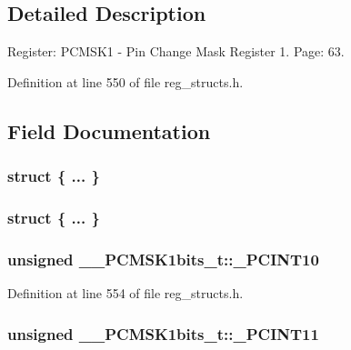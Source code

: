 \subsection{Detailed Description}
Register\+: P\+C\+M\+S\+K1 -\/ Pin Change Mask Register 1. Page\+: 63. 

Definition at line 550 of file reg\+\_\+structs.\+h.



\subsection{Field Documentation}
\hypertarget{union_____p_c_m_s_k1bits__t_a107fd294fbf0feff9d32f2159b25b7c4}{\subsubsection[{"@133}]{\setlength{\rightskip}{0pt plus 5cm}struct \{ ... \} }}\label{union_____p_c_m_s_k1bits__t_a107fd294fbf0feff9d32f2159b25b7c4}
\hypertarget{union_____p_c_m_s_k1bits__t_a04acb1435b4b7e9f1f381c6b1add8825}{\subsubsection[{"@135}]{\setlength{\rightskip}{0pt plus 5cm}struct \{ ... \} }}\label{union_____p_c_m_s_k1bits__t_a04acb1435b4b7e9f1f381c6b1add8825}
\hypertarget{union_____p_c_m_s_k1bits__t_aaafc92648c78154a0e7087a3b94895af}{
\subsubsection[{\+\_\+\+P\+C\+I\+N\+T10}]{\setlength{\rightskip}{0pt plus 5cm}unsigned \+\_\+\+\_\+\+P\+C\+M\+S\+K1bits\+\_\+t\+::\+\_\+\+P\+C\+I\+N\+T10}}\label{union_____p_c_m_s_k1bits__t_aaafc92648c78154a0e7087a3b94895af}


Definition at line 554 of file reg\+\_\+structs.\+h.

\hypertarget{union_____p_c_m_s_k1bits__t_ac840e7c205be625181b8eed24e55607a}{
\subsubsection[{\+\_\+\+P\+C\+I\+N\+T11}]{\setlength{\rightskip}{0pt plus 5cm}unsigned \+\_\+\+\_\+\+P\+C\+M\+S\+K1bits\+\_\+t\+::\+\_\+\+P\+C\+I\+N\+T11}}\label{union_____p_c_m_s_k1bits__t_ac840e7c205be625181b8eed24e55607a}


